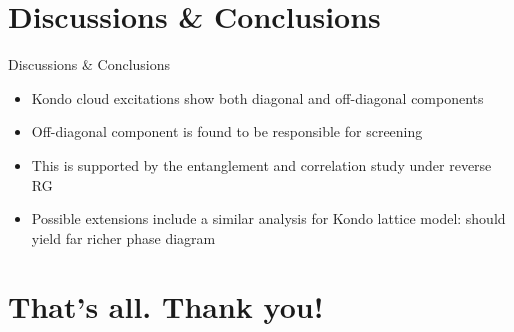\documentclass[aspectratio=169]{beamer}
\begin{document}
\section{Discussions \& Conclusions}
\begin{frame}[noframenumbering]{Discussions \& Conclusions}
	\begin{itemize}[<+-|alert@+>]
		\item Kondo cloud excitations show both diagonal and off-diagonal components\\[10pt]
 		\item Off-diagonal component is found to be responsible for screening\\[10pt]
 		\item This is supported by the entanglement and correlation study under reverse RG\\[10pt]
 		\item Possible extensions include a similar analysis for Kondo lattice model: should yield far richer phase diagram\\[10pt]
	\end{itemize}
\end{frame}

\section{That's all. Thank you!}
\end{document}
